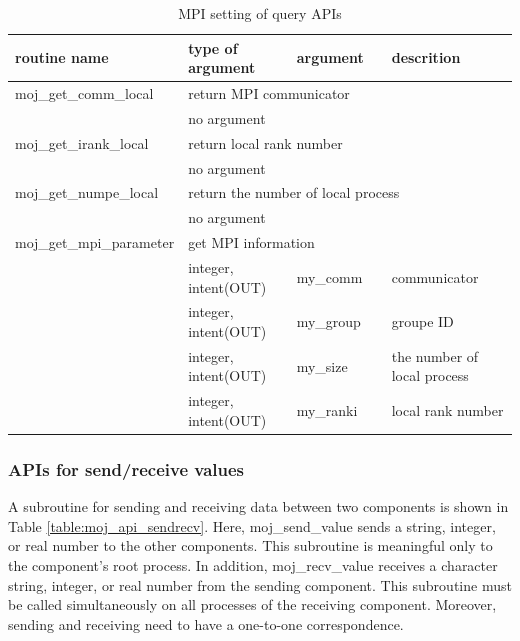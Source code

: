 \documentclass[11pt,a4paper]{report}
\newcommand{\tabref}[1]{Table \ref{#1}}
\begin{document}
\begin{table}[H]
\begin{center}
\caption{MPI setting of query APIs }
{\small
\label{table:moj_api_mpi}
\begin{tabular}{llll}
\hline\hline
routine name & type of argument & argument　& descrition \\
\hline
 moj\_get\_comm\_local &  \multicolumn{3}{l}{return MPI communicator}\\
           &  no argument &   & \\
\hline
 moj\_get\_irank\_local &  \multicolumn{3}{l}{return local rank number}\\
           &  no argument &   & \\
\hline
 moj\_get\_numpe\_local &  \multicolumn{3}{l}{return the number of local process}\\
           &  no argument &   & \\
\hline
 moj\_get\_mpi\_parameter& \multicolumn{3}{l}{get MPI information} \\ 
                & integer, intent(OUT) & my\_comm & communicator\\
                & integer, intent(OUT) & my\_group& groupe ID\\
                & integer, intent(OUT) & my\_size & the number of local process\\
                & integer, intent(OUT) & my\_ranki& local rank number\\
\hline\hline
\end{tabular}
}
\end{center}
\end{table}

\subsubsection{APIs for send/receive values}
A subroutine for sending and receiving data between two components is shown in \tabref{table:moj_api_sendrecv}. Here, 
moj\_send\_value sends a string, integer, or real number to the other components. 
This subroutine is meaningful only to the component's root process. 
In addition, moj\_recv\_value receives a character string, integer, or real number from the sending component. 
This subroutine must be called simultaneously on all processes of the receiving component. 
Moreover, sending and receiving need to have a one-to-one correspondence.
\end{document}

